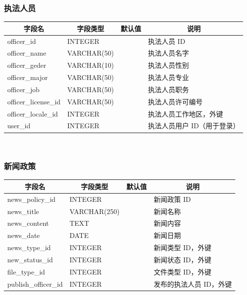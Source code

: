 \documentclass[a4paper, 12pt]{article}
\begin{document}
	\subsubsection{\normalfont 执法人员}

	\begin{tabular}{l|l|l|l}
		\toprule
		\multicolumn{1}{c|}{字段名}	& \multicolumn{1}{c|}{字段类型}	& \multicolumn{1}{c|}{默认值}	& \multicolumn{1}{c}{说明} \\
		\midrule
		officer\_id					& INTEGER 						& 								& 执法人员 ID \\
		\midrule
		officer\_name				& VARCHAR(50)					& 								& 执法人员名字 \\
		\midrule
		officer\_geder				& VARCHAR(10)					& 								& 执法人员性别 \\
		\midrule
		officer\_major				& VARCHAR(50)					& 								& 执法人员专业 \\
		\midrule
		officer\_job				& VARCHAR(50)					& 								& 执法人员职务 \\
		\midrule
		officer\_license\_id		& VARCHAR(50)					& 								& 执法人员许可编号 \\
		\midrule
		officer\_locale\_id			& INTEGER 						& 								& 执法人员工作地区，外键 \\
		\midrule
		user\_id					& INTEGER 						& 								& 执法人员用户 ID（用于登录） \\
		\bottomrule
	\end{tabular} \\

	\subsubsection{\normalfont 新闻政策}

	\begin{tabular}{l|l|l|l}
		\toprule
		\multicolumn{1}{c|}{字段名}	& \multicolumn{1}{c|}{字段类型}	& \multicolumn{1}{c|}{默认值}	& \multicolumn{1}{c}{说明} \\
		\midrule
		news\_policy\_id			& INTEGER 						& 								& 新闻政策 ID \\
		\midrule
		news\_title					& VARCHAR(250)					& 								& 新闻名称 \\
		\midrule
		news\_content				& TEXT							& 								& 新闻内容 \\
		\midrule
		news\_date					& DATE							& 								& 新闻日期 \\
		\midrule
		news\_type\_id				& INTEGER						& 								& 新闻类型 ID，外键 \\
		\midrule
		new\_status\_id				& INTEGER						& 								& 新闻状态 ID，外键 \\
		\midrule
		file\_type\_id				& INTEGER 						& 								& 文件类型 ID，外键 \\
		\midrule
		publish\_officer\_id		& INTEGER 						& 								& 发布的执法人员 ID，外键 \\
		\bottomrule
	\end{tabular} \\
\end{document}
